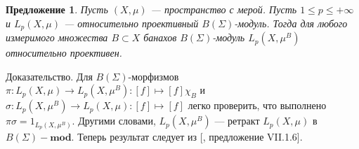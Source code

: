 \documentclass[12pt]{article}
\numberwithin{equation}{subsection}
\theoremstyle{plain}
\newtheorem{proposition}{Предложение}
\newenvironment{proof}{Доказательство.}{}
\begin{document}
\begin{fulltext}
    \begin{proposition}\label{BSigmaModLpRetrProj} Пусть $(X,\mu)$ ---
        пространство с мерой. Пусть $1\leq p\leq +\infty$ и $L_p(X,\mu)$ ---
        относительно проективный $B(\Sigma)$-модуль. Тогда для любого измеримого
        множества $B\subset X$ банахов $B(\Sigma)$-модуль $L_p(X,\mu^B)$
        относительно проективен.
    \end{proposition}
    \begin{proof} Для $B(\Sigma)$-морфизмов $\pi:L_p(X,\mu)\to
            L_p(X,\mu^B):[f]\mapsto [f]\chi_B$ и $\sigma:L_p(X,\mu^B)\to
            L_p(X,\mu):[f]\mapsto [f]$ легко проверить, что выполнено
        $\pi\sigma=1_{L_p(X,\mu^B)}$. Другими словами, $L_p(X,\mu^B)$ ---
        ретракт $L_p(X,\mu)$ в $B(\Sigma)-\mathbf{mod}$. Теперь результат
        следует из [\cite{HelBanLocConvAlg}, предложение VII.1.6].
    \end{proof}


\end{fulltext}
\end{document}
